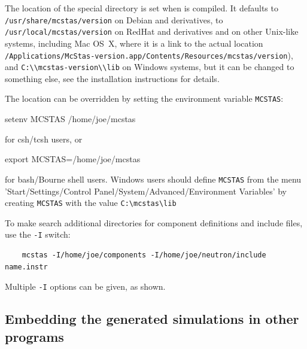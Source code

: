 The location of the special \MCS directory is set
when \mcs is compiled.
It defaults to \nolinkurl{/usr/share/mcstas/version} on Debian and derivatives,
to \nolinkurl{/usr/local/mcstas/version} on RedHat and derivatives
and on other Unix-like systems, including Mac OS~X,
where it is a link to the actual location
\nolinkurl{/Applications/McStas-version.app/Contents/Resources/mcstas/version}),
and \nolinkurl{C:\\mcstas-version\\lib} on Windows systems,
but it can be changed to something else,
see the installation instructions for details.

The location can be
overridden by setting the environment variable \verb+MCSTAS+:
\begin{bash}
    setenv MCSTAS /home/joe/mcstas
\end{bash}
for csh/tcsh users, or
\begin{bash}
    export MCSTAS=/home/joe/mcstas
\end{bash}
for bash/Bourne shell users.  Windows users should define
\verb+MCSTAS+ from the menu 'Start/Settings/Control
Panel/System/Advanced/Environment Variables' by creating \verb+MCSTAS+ with the
value \verb+C:\mcstas\lib+

To make \mcs search additional directories for component definitions
and include files, use the \verb+-I+ switch:
\begin{lstlisting}
    mcstas -I/home/joe/components -I/home/joe/neutron/include name.instr
\end{lstlisting}
Multiple \verb+-I+ options can be given, as shown.

\subsection{Embedding the generated simulations in other programs}


